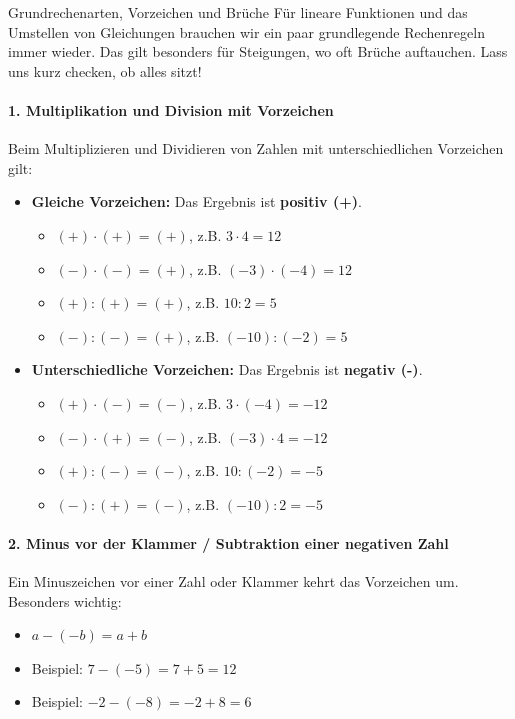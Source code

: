\begin{erinnerungsboxumgebung}{Grundrechenarten, Vorzeichen und Brüche}
Für lineare Funktionen und das Umstellen von Gleichungen brauchen wir ein paar grundlegende Rechenregeln immer wieder. Das gilt besonders für Steigungen, wo oft Brüche auftauchen. Lass uns kurz checken, ob alles sitzt!

\paragraph{1. Multiplikation und Division mit Vorzeichen}
Beim Multiplizieren und Dividieren von Zahlen mit unterschiedlichen Vorzeichen gilt:
\begin{itemize}
    \item \textbf{Gleiche Vorzeichen:} Das Ergebnis ist \textbf{positiv (+)}.
    \begin{itemize}
        \item $(+) \cdot (+) = (+)$, z.B. $3 \cdot 4 = 12$
        \item $(-) \cdot (-) = (+)$, z.B. $(-3) \cdot (-4) = 12$
        \item $(+) : (+) = (+)$, z.B. $10 : 2 = 5$
        \item $(-) : (-) = (+)$, z.B. $(-10) : (-2) = 5$
    \end{itemize}
    \item \textbf{Unterschiedliche Vorzeichen:} Das Ergebnis ist \textbf{negativ (-)}.
    \begin{itemize}
        \item $(+) \cdot (-) = (-)$, z.B. $3 \cdot (-4) = -12$
        \item $(-) \cdot (+) = (-)$, z.B. $(-3) \cdot 4 = -12$
        \item $(+) : (-) = (-)$, z.B. $10 : (-2) = -5$
        \item $(-) : (+) = (-)$, z.B. $(-10) : 2 = -5$
    \end{itemize}
\end{itemize}

\paragraph{2. Minus vor der Klammer / Subtraktion einer negativen Zahl}
Ein Minuszeichen vor einer Zahl oder Klammer kehrt das Vorzeichen um. Besonders wichtig:
\begin{itemize}
    \item $a - (-b) = a + b$
    \item Beispiel: $7 - (-5) = 7 + 5 = 12$
    \item Beispiel: $-2 - (-8) = -2 + 8 = 6$
\end{itemize}


\end{erinnerungsboxumgebung}
